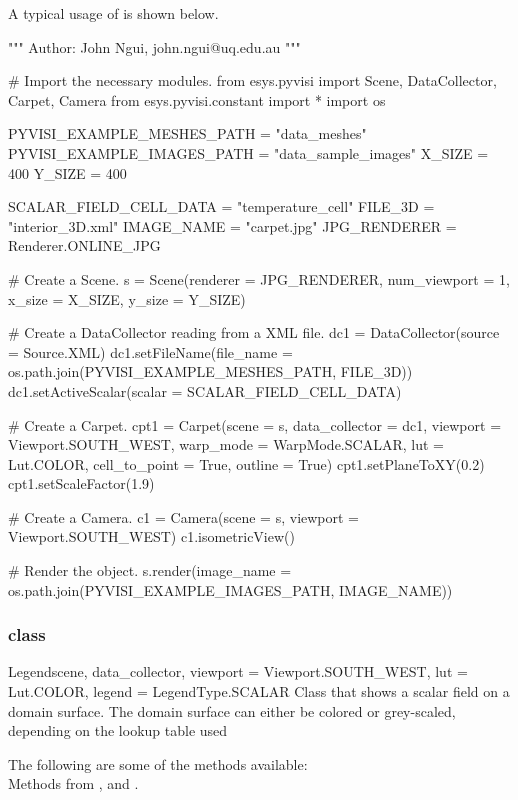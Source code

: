 A typical usage of \Carpet is shown below.

\begin{python}
"""
Author: John Ngui, john.ngui@uq.edu.au
"""

# Import the necessary modules.
from esys.pyvisi import Scene, DataCollector, Carpet, Camera
from esys.pyvisi.constant import *
import os

PYVISI_EXAMPLE_MESHES_PATH = "data_meshes"
PYVISI_EXAMPLE_IMAGES_PATH = "data_sample_images"
X_SIZE = 400
Y_SIZE = 400

SCALAR_FIELD_CELL_DATA = "temperature_cell"
FILE_3D = "interior_3D.xml"
IMAGE_NAME = "carpet.jpg"
JPG_RENDERER = Renderer.ONLINE_JPG

# Create a Scene.
s = Scene(renderer = JPG_RENDERER, num_viewport = 1, x_size = X_SIZE, 
        y_size = Y_SIZE)

# Create a DataCollector reading from a XML file.
dc1 = DataCollector(source = Source.XML)
dc1.setFileName(file_name = os.path.join(PYVISI_EXAMPLE_MESHES_PATH, FILE_3D))
dc1.setActiveScalar(scalar = SCALAR_FIELD_CELL_DATA)

# Create a Carpet.
cpt1 = Carpet(scene = s, data_collector = dc1, viewport = Viewport.SOUTH_WEST, 
        warp_mode = WarpMode.SCALAR, lut = Lut.COLOR, cell_to_point = True,
        outline = True)
cpt1.setPlaneToXY(0.2)
cpt1.setScaleFactor(1.9)

# Create a Camera.
c1 = Camera(scene = s, viewport = Viewport.SOUTH_WEST)
c1.isometricView()

# Render the object.
s.render(image_name = os.path.join(PYVISI_EXAMPLE_IMAGES_PATH, IMAGE_NAME))
\end{python}

\subsubsection{\Legend class}

\begin{classdesc}{Legend}{scene, data_collector, 
viewport = Viewport.SOUTH_WEST, lut = Lut.COLOR, legend = LegendType.SCALAR}
Class that shows a scalar field on a domain surface. The domain surface
can either be colored or grey-scaled, depending on the lookup table used
\end{classdesc}

The following are some of the methods available:\\
Methods from \ActorThreeD, \ScalarBar and \DataSetMapper.


